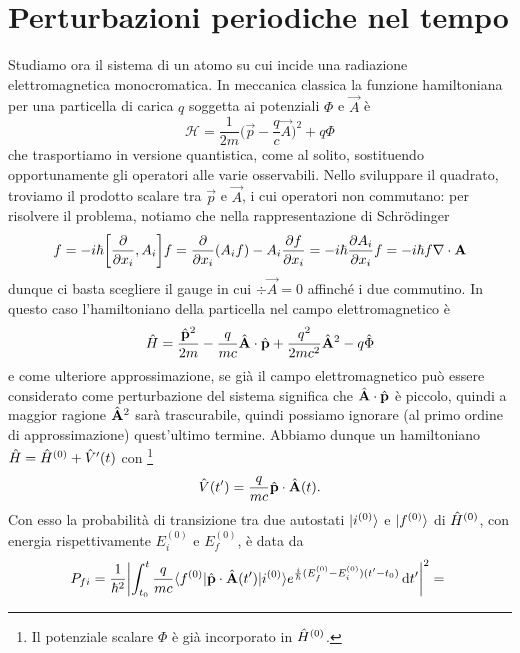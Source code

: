 \section{Perturbazioni periodiche nel tempo}
Studiamo ora il sistema di un atomo su cui incide una radiazione elettromagnetica monocromatica.
In meccanica classica la funzione hamiltoniana per una particella di carica $q$ soggetta ai potenziali $\Phi$ e $\vec A$ è
\begin{equation}
	\mathcal H=\frac1{2m}\bigg(\vec p-\frac{q}{c}\vec A\bigg)^2+q\Phi
	\label{eq:hamiltoniana-potenziale-elettromagnetico}
\end{equation}
che trasportiamo in versione quantistica, come al solito, sostituendo opportunamente gli operatori alle varie osservabili.
Nello sviluppare il quadrato, troviamo il prodotto scalare tra $\vec p$ e $\vec A$, i cui operatori non commutano: per risolvere il problema, notiamo che nella rappresentazione di Schr\"odinger
\begin{equation}
	[\op p_i,\op A_i]f=-i\hbar\bigg[\drp{}{x_i},A_i\bigg]f=\drp{}{x_i}(A_if)-A_i\drp{f}{x_i}=-i\hbar\drp{A_i}{x_i}f=-i\hbar f\div\vec A
	\label{eq:commutatore-impulso-potenziale-vettore}
\end{equation}
dunque ci basta scegliere il gauge in cui $\div\vec A=0$ affinch\'e i due commutino.
In questo caso l'hamiltoniano della particella nel campo elettromagnetico è
\begin{equation}
	\op H=\frac{\op{\vec p}^2}{2m}-\frac{q}{mc}\scalar{\op{\vec A}}{\op{\vec p}}+\frac{q^2}{2mc^2}\op{\vec A}^2-q\op{\Phi}
	\label{eq:hamiltoniano-campo-elettromagnetico}
\end{equation}
e come ulteriore approssimazione, se già il campo elettromagnetico può essere considerato come perturbazione del sistema significa che $\scalar{\op{\vec A}}{\op{\vec p}}$ è piccolo, quindi a maggior ragione $\op{\vec A}^2$ sarà trascurabile, quindi possiamo ignorare (al primo ordine di approssimazione) quest'ultimo termine.
Abbiamo dunque un hamiltoniano $\op H=\op H^{(0)}+\op V'(t)$ con
\footnote{Il potenziale scalare $\Phi$ è già incorporato in $\op H^{(0)}$.}
\begin{equation}
	\op V(t')=\frac{q}{mc}\scalar{\op{\vec p}}{\op{\vec A}}(t).
\end{equation}
Con esso la probabilità di transizione tra due autostati $\ket{i^{(0)}}$ e $\ket{f^{(0)}}$ di $\op H^{(0)}$, con energia rispettivamente $E_i^{(0)}$ e $E_f^{(0)}$, è data da
\begin{equation}
    P_{fi}=\frac1{\hbar^2}\abs[\bigg]{\int_{t_0}^t\frac{q}{mc}\bra{f^{(0)}}\scalar{\op{\vec p}}{\op{\vec A}}(t')\ket{i^{(0)}}e^{\frac{i}{\hbar}(E_f^{(0)}-E_i^{(0)})(t'-t_0)}\,\dd t'}^2=\\
\end{equation}
